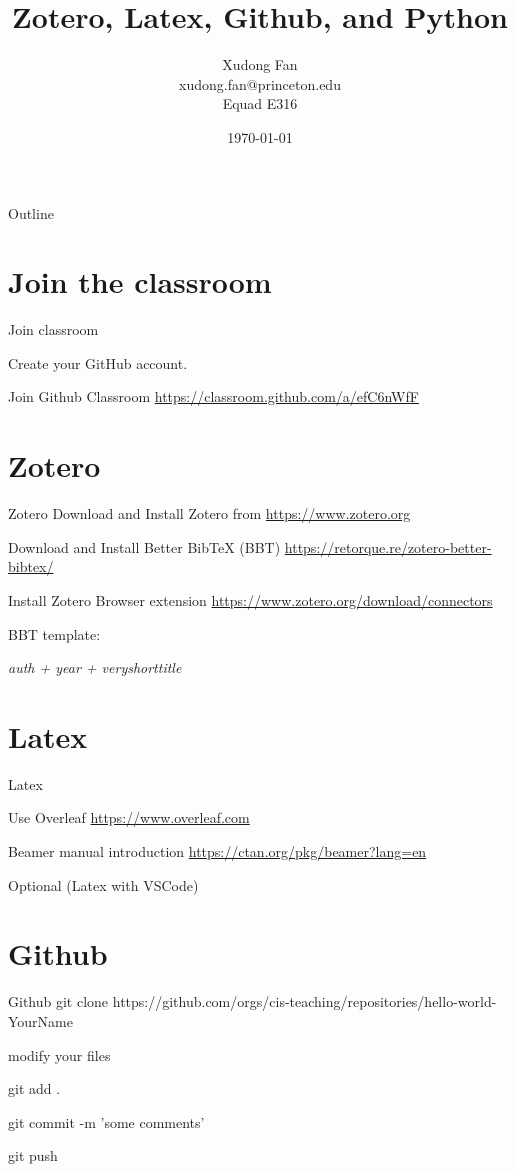 \documentclass{beamer}
\title{Zotero, Latex, Github, and Python}
\author{Xudong Fan \\ xudong.fan@princeton.edu \\ Equad E316}
\date{\today}
\begin{document}
\begin{frame}
    \titlepage
\end{frame}

\logo{}


\begin{frame}{Outline}
    \tableofcontents
\end{frame}

\section{Join the classroom}
\begin{frame}{Join classroom}

    Create your GitHub account.

    Join Github Classroom \url{https://classroom.github.com/a/efC6nWfF}

\end{frame}

\section{Zotero}
\begin{frame}{Zotero}
    Download and Install Zotero from \url{https://www.zotero.org}

    Download and Install Better BibTeX (BBT) \url{https://retorque.re/zotero-better-bibtex/}

    Install Zotero Browser extension \url{https://www.zotero.org/download/connectors}

    BBT template:

    \em{auth + year + veryshorttitle}

\end{frame}

\section{Latex}
\begin{frame}{Latex}

    Use Overleaf \url{https://www.overleaf.com}

    Beamer manual introduction \url{https://ctan.org/pkg/beamer?lang=en}

    Optional (Latex with VSCode)

\end{frame}

\section{Github}
\begin{frame}{Github}
    git clone {https://github.com/orgs/cis-teaching/repositories/hello-world-YourName}

    modify your files

    git add .

    git commit -m 'some comments'

    git push
\end{frame}
\end{document}
